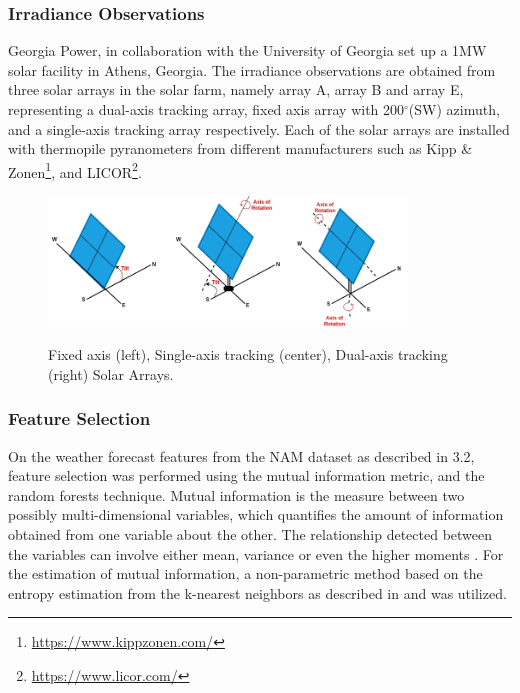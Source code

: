 \subsubsection*{Irradiance Observations}
\par Georgia Power, in collaboration with the University of Georgia set up a 1MW solar facility in Athens, Georgia. The irradiance observations are obtained from three solar arrays in the solar farm, namely array A, array B and array E, representing a dual-axis tracking array, fixed axis array with 200$^{\circ}$(SW) azimuth, and a single-axis tracking array respectively. Each of the solar arrays are installed with thermopile pyranometers from different manufacturers such as Kipp \& Zonen\footnote{\url{https://www.kippzonen.com/}}, and LICOR\footnote{\url{https://www.licor.com/}}.

\begin{figure}[htbp]
    \begin{center}
    	\includegraphics[width=0.85\textwidth]{chapter3/fig_pyranometers.png}
    	\label{fig:fig_pyranometers}
    	\caption[Fixed axis, Single-axis tracking, Dual-axis tracking Solar Arrays]{Fixed axis (left), Single-axis tracking (center), Dual-axis tracking (right) Solar Arrays.}
    \end{center}
\end{figure}


\subsubsection*{Feature Selection}
On the weather forecast features from the NAM dataset as described in 3.2, feature selection was performed using the mutual information metric, and the random forests technique. Mutual information is the measure between two possibly multi-dimensional variables, which quantifies the amount of information obtained from one variable about the other. The relationship detected between the variables can involve either mean, variance or even the higher moments \cite{feature_selection_mi}. For the estimation of mutual information, a non-parametric method based on the entropy estimation from the k-nearest neighbors as described in \cite{feature_selection_mi} and \cite{feature_selection_mi2} was utilized. 


